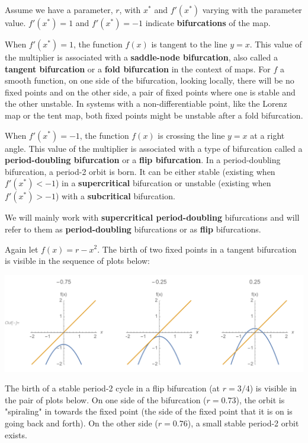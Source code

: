 \documentclass[12pt,letterpaper,noanswers]{exam}
\begin{document}
\begin{tcolorbox}

Assume we have a parameter, $r$, with $x^*$ and $f'(x^*)$ varying with the parameter value.  $f'(x^*) = 1$ and $f'(x^*)=-1$ indicate \textbf{bifurcations} of the map.

When $f'(x^*) = 1$, the function $f(x)$ is tangent to the line $y = x$.  This value of the multiplier is associated with a \textbf{saddle-node bifurcation}, also called a \textbf{tangent bifurcation} or a \textbf{fold bifurcation} in the context of maps.  For $f$ a smooth function, on one side of the bifurcation, looking locally, there will be no fixed points and on the other side, a pair of fixed points where one is stable and the other unstable.  In systems with a non-differentiable point, like the Lorenz map or the tent map, both fixed points might be unstable after a fold bifurcation.
\end{tcolorbox}

\begin{tcolorbox}

When $f'(x^*) = -1$, the function $f(x)$ is crossing the line $y=x$ at a right angle.  This value of the multiplier is associated with a type of bifurcation called a \textbf{period-doubling bifurcation} or a \textbf{flip bifurcation}.  In a period-doubling bifurcation, a period-2 orbit is born.  It can be either stable (existing when $f'(x^*)<-1$) in a \textbf{supercritical} bifurcation or unstable (existing when $f'(x^*)>-1$) with a \textbf{subcritical} bifurcation.

We will mainly work with \textbf{supercritical period-doubling} bifurcations and will refer to them as \textbf{period-doubling} bifurcations or as \textbf{flip} bifurcations.
\end{tcolorbox}

Again let $f(x) = r - x^2$.  The birth of two fixed points in a tangent bifurcation is visible in the sequence of plots below:

\includegraphics[width=\textwidth]{img/191105-C26p1.pdf}

The birth of a stable period-2 cycle in a flip bifurcation (at $r = 3/4$) is visible in the pair of plots below.  On one side of the bifurcation ($r = 0.73$), the orbit is "spiraling" in towards the fixed point (the side of the fixed point that it is on is going back and forth).  On the other side ($r=0.76$), a small stable period-2 orbit exists.
\end{document}
